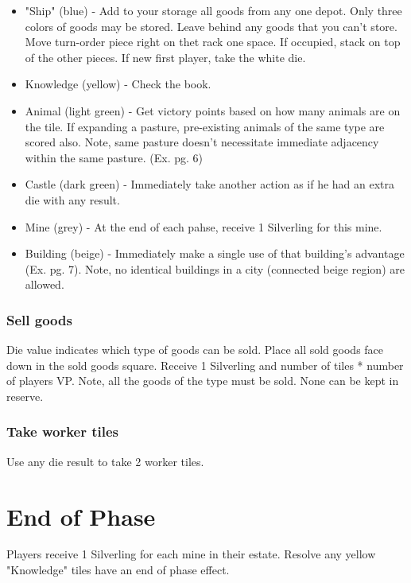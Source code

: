 \documentclass[12pt]{article}
\newenvironment{itemizeCustom}
{\begin{itemize}
  \setlength{\itemsep}{1pt}
  \setlength{\parskip}{0pt}
  \setlength{\parsep}{0pt}}
{\end{itemize}}
\begin{document}
\begin{multicols*}{2}
\begin{itemizeCustom}
	\item "Ship" (blue) - Add to your storage all goods from any one depot. Only three colors of goods may be stored. Leave behind any goods that you can't store. Move turn-order piece right on thet rack one space. If occupied, stack on top of the other pieces. If new first player, take the white die.
	\item Knowledge (yellow) - Check the book.
	\item Animal (light green) - Get victory points based on how many animals are on the tile. If expanding a pasture, pre-existing animals of the same type are scored also. Note, same pasture doesn't necessitate immediate adjacency within the same pasture. (Ex. pg. 6)
	\item Castle (dark green) - Immediately take another action as if he had an extra die with any result.
	\item Mine (grey) - At the end of each pahse, receive 1 Silverling for this mine.
	\item Building (beige) - Immediately make a single use of that building's advantage (Ex. pg. 7). Note, no identical buildings in a city (connected beige region) are allowed.
\end{itemizeCustom}

\subsubsection*{Sell goods}
Die value indicates which type of goods can be sold. Place all sold goods face down in the sold goods square. Receive 1 Silverling and number of tiles * number of players VP. Note, all the goods of the type must be sold. None can be kept in reserve.

\subsubsection*{Take worker tiles}
Use any die result to take 2 worker tiles.

\section*{End of Phase}
Players receive 1 Silverling for each mine in their estate. Resolve any yellow "Knowledge" tiles have an end of phase effect.


\end{multicols*}
\end{document}
